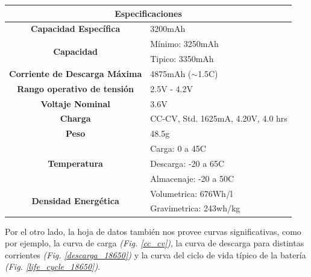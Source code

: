 \documentclass[10pt,a4paper]{article}
\begin{document}
\begin{table}[h!]
\begin{center}
\begin{tabular}{|c|l|}
\hline
\multicolumn{2}{|c|}{Especificaciones}                                             \\ \hline
\textbf{Capacidad Específica}                 & 3200mAh                            \\ \hline
\multirow{2}{*}{\textbf{Capacidad}}           & Mínimo: 3250mAh                    \\ \cline{2-2} 
                                              & Tipico: 3350mAh                    \\ \hline
\textbf{Corriente de Descarga Máxima}         & 4875mAh ($\sim$1.5C)               \\ \hline
\textbf{Rango operativo de tensión}           & 2.5V - 4.2V                        \\ \hline
\textbf{Voltaje Nominal}                      & 3.6V                               \\ \hline
\textbf{Charga}                               & CC-CV, Std. 1625mA, 4.20V, 4.0 hrs \\ \hline
\textbf{Peso}                                 & 48.5g                              \\ \hline
\multirow{3}{*}{\textbf{Temperatura}}         & Carga: 0 a 45C                     \\ \cline{2-2} 
                                              & Descarga: -20 a 65C                \\ \cline{2-2} 
                                              & Almacenaje: -20 a 50C              \\ \hline
\multirow{2}{*}{\textbf{Densidad Energética}} & Volumetrica: 676Wh/l               \\ \cline{2-2} 
                                              & Gravimetrica: 243wh/kg             \\ \hline
\end{tabular}%
\end{center}
\end{table}

Por el otro lado, la hoja de datos también nos provee curvas significativas, como por ejemplo, la curva de carga \emph{(Fig. \ref{cc_cv})}, la curva de descarga para distintas corrientes \emph{(Fig. \ref{descarga_18650})} y la curva del ciclo de vida típico de la batería \emph{(Fig. \ref{life_cycle_18650})}.
\end{document}
